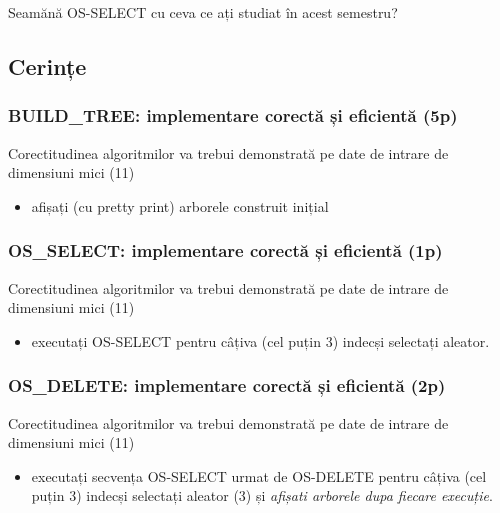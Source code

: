 \documentclass[../ro-fa-lab.tex]{subfiles}
\begin{document}
Seamănă OS-SELECT cu ceva ce ați studiat în acest semestru?

\subsection{Cerințe}\label{cerinux21be}

\subsubsection{BUILD\_TREE: implementare corectă și eficientă
(5p)}\label{build_tree-implementare-corectux103-ux219i-eficientux103-5p}

Corectitudinea algoritmilor va trebui demonstrată pe date de intrare de
dimensiuni mici (11)

\begin{itemize}
\item
  afișați (cu pretty print) arborele construit inițial
\end{itemize}

\subsubsection{OS\_SELECT: implementare corectă și eficientă
(1p)}\label{os_select-implementare-corectux103-ux219i-eficientux103-1p}

Corectitudinea algoritmilor va trebui demonstrată pe date de intrare de
dimensiuni mici (11)

\begin{itemize}
\item
  executați OS-SELECT pentru câțiva (cel puțin 3) indecși selectați
  aleator.
\end{itemize}

\subsubsection{OS\_DELETE: implementare corectă și eficientă
(2p)}\label{os_delete-implementare-corectux103-ux219i-eficientux103-2p}

Corectitudinea algoritmilor va trebui demonstrată pe date de intrare de
dimensiuni mici (11)

\begin{itemize}
\item
  executați secvența OS-SELECT urmat de OS-DELETE pentru câțiva (cel
  puțin 3) indecși selectați aleator (3) și \emph{afișati arborele dupa
  fiecare execuție}.
\end{itemize}
\end{document}
